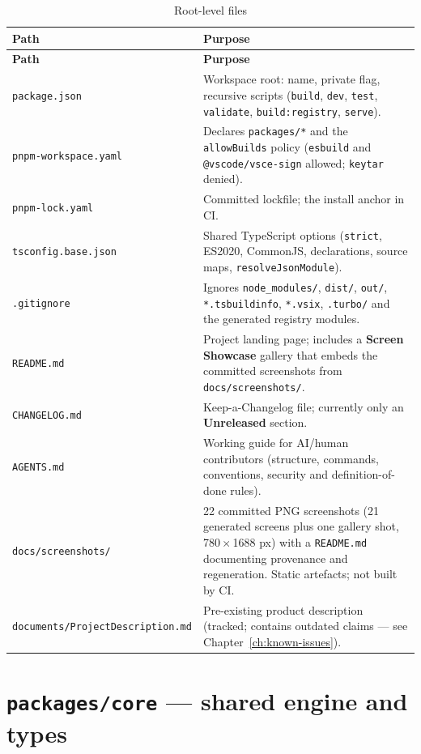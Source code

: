 \begin{longtable}{@{}L{5cm}L{9.4cm}@{}}
\caption{Root-level files}\\
\toprule
\textbf{Path} & \textbf{Purpose} \\
\midrule
\endfirsthead
\toprule
\textbf{Path} & \textbf{Purpose} \\
\midrule
\endhead
\texttt{package.json} & Workspace root: name, private flag, recursive scripts
(\texttt{build}, \texttt{dev}, \texttt{test}, \texttt{validate},
\texttt{build:registry}, \texttt{serve}). \\
\texttt{pnpm-workspace.yaml} & Declares \texttt{packages/*} and the
\texttt{allowBuilds} policy (\texttt{esbuild} and
\texttt{@vscode/vsce-sign} allowed; \texttt{keytar} denied). \\
\texttt{pnpm-lock.yaml} & Committed lockfile; the install anchor in CI. \\
\texttt{tsconfig.base.json} & Shared TypeScript options (\texttt{strict},
ES2020, CommonJS, declarations, source maps, \texttt{resolveJsonModule}). \\
\texttt{.gitignore} & Ignores \texttt{node\_modules/}, \texttt{dist/},
\texttt{out/}, \texttt{*.tsbuildinfo}, \texttt{*.vsix}, \texttt{.turbo/} and the
generated registry modules. \\
\texttt{README.md} & Project landing page; includes a \textbf{Screen Showcase}
gallery that embeds the committed screenshots from \texttt{docs/screenshots/}. \\
\texttt{CHANGELOG.md} & Keep-a-Changelog file; currently only an
\textbf{Unreleased} section. \\
\texttt{AGENTS.md} & Working guide for AI/human contributors (structure,
commands, conventions, security and definition-of-done rules). \\
\texttt{docs/screenshots/} & 22 committed PNG screenshots (21 generated screens
plus one gallery shot, 780\,$\times$\,1688 px) with a \texttt{README.md}
documenting provenance and regeneration. Static artefacts; not built by CI. \\
\texttt{documents/ProjectDescription.md} & Pre-existing product description
(tracked; contains outdated claims --- see Chapter~\ref{ch:known-issues}). \\
\bottomrule
\end{longtable}

\section{\texttt{packages/core} --- shared engine and types}

